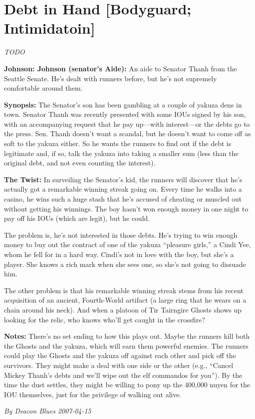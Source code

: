 \documentclass[letterpaper,twocolumn,10.5pt]{article}
\newenvironment{scenario}[6]
	{
		\section{#1 {\small[#2]}}
		\textit{#3}
		\def\TMPSCENARIO{#4 #5}
	}
	{\small\textit{By \TMPSCENARIO}}
\newcommand{\johnson}[2]{\textbf{Johnson: #1 (#2):}}
\newcommand{\synopsis}{\textbf{Synopsis: }}
\newcommand{\notes}{\textbf{Notes: }}
\newcommand{\twist}{\textbf{The Twist: }}
\begin{document}
\begin{scenario}{Debt in Hand}
	{Bodyguard; Intimidatoin}
	{TODO}
	{Deacon Blues}
	{2007-04-15}
	{https://forum.rpg.net/showthread.php?321504-Shadowrun-4th-101-Instant-Scenarios\&p=7173882#post7173882}

\johnson{Johnson}{senator's Aide} 
An aide to Senator Thanh from the Seattle Senate. He's dealt with runners before, but he's not supremely comfortable around them.

\synopsis The Senator's son has been gambling at a couple of yakuza dens in town. Senator Thanh was recently presented with some IOUs signed by his son, with an accompanying request that he pay up---with interest---or the debts go to the press. Sen. Thanh doesn't want a scandal, but he doesn't want to come off as soft to the yakuza either. So he wants the runners to find out if the debt is legitimate and, if so, talk the yakuza into taking a smaller sum (less than the original debt, and not even counting the interest).

\twist In surveiling the Senator's kid, the runners will discover that he's actually got a remarkable winning streak going on. Every time he walks into a casino, he wins such a huge stash that he's accused of cheating or muscled out without getting his winnings. The boy hasn't won enough money in one night to pay off his IOUs (which are legit), but he could.

The problem is, he's not interested in those debts. He's trying to win enough money to buy out the contract of one of the yakuza ``pleasure girls,'' a Cindi Yee, whom he fell for in a hard way. Cindi's not in love with the boy, but she's a player. She knows a rich mark when she sees one, so she's not going to dissuade him.

The other problem is that his remarkable winning streak stems from his recent acquisition of an ancient, Fourth-World artifact (a large ring that he wears on a chain around his neck). And when a platoon of Tir Tairngire Ghosts shows up looking for the relic, who knows who'll get caught in the crossfire?

\notes  There's no set ending to how this plays out. Maybe the runners kill both the Ghosts and the yakuza, which will earn them powerful enemies. The runners could play the Ghosts and the yakuza off against each other and pick off the survivors. They might make a deal with one side or the other (e.g., ``Cancel Mickey Thanh's debts and we'll wipe out the elf commandos for you''). By the time the dust settles, they might be willing to pony up the 400,000 nuyen for the IOU themselves, just for the privilege of walking out alive. 

\end{scenario}
\end{document}
